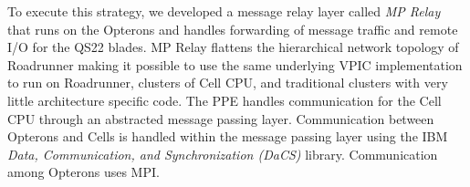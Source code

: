 \documentclass[letter,10pt]{article}
\begin{document}





To execute this strategy, we developed a message relay layer called
\emph{MP Relay} that runs on the Opterons and handles forwarding of
message traffic and remote I/O for the QS22 blades.  
MP Relay flattens the hierarchical network
topology of Roadrunner making it possible to use the same underlying
VPIC implementation to run on Roadrunner, clusters of Cell CPU, and
traditional clusters with very little architecture specific code.  The
PPE handles communication for the Cell CPU through an abstracted
message passing layer.  Communication between Opterons and Cells is
handled within the message passing layer using the IBM \emph{Data,
Communication, and Synchronization (DaCS)} library. 
Communication among Opterons uses MPI.

\end{document}
